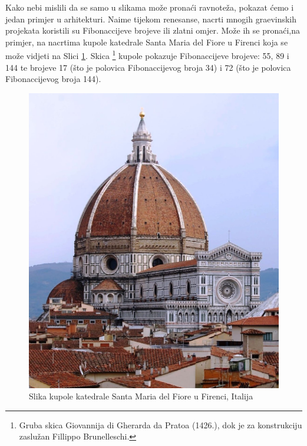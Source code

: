 \documentclass[14pt]{scrartcl}
\begin{document}
Kako nebi mislili da se samo u slikama mo\v{z}e prona\'{c}i ravnote\v{z}a, pokazat \'{c}emo i jedan primjer u arhitekturi.
Naime tijekom renesanse, nacrti mnogih gra\dj{}evinskih projekata koristili su Fibonaccijeve brojeve ili zlatni omjer. Mo\v{z}e ih se prona\'{c}i,na primjer, na nacrtima kupole katedrale Santa Maria del Fiore u Firenci koja se mo\v{z}e vidjeti na Slici \ref{fig:kupola}. Skica \footnote{Gruba skica Giovannija di Gherarda da Pratoa (1426.), dok je za konstrukciju zaslu\v{z}an Fillippo Brunelleschi.} kupole pokazuje Fibonaccijeve brojeve: 55, 89 i 144 te brojeve 17 (\v{s}to je polovica Fibonaccijevog broja 34) i 72 (\v{s}to je polovica Fibonaccijevog broja 144).\\
\newpage
\begin{figure}[hb!]
\begin{center}
\includegraphics[scale=0.4]{Kupola.jpg}
\end{center}
\caption{Slika kupole katedrale Santa Maria del Fiore u Firenci, Italija}
\label{fig:kupola}
\end{figure}

\newpage
\end{document}
